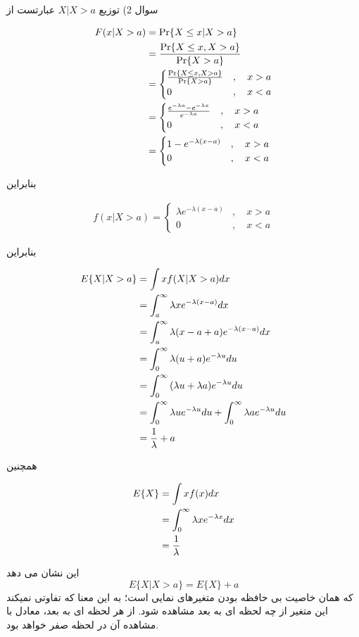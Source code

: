 \documentclass[10pt,letterpaper]{report}
\newcommand{\eqn}[1]{
\[\begin{split}
#1
\end{split}\]
}
\begin{document}
سوال 2) توزیع $X|X>a$ عبارتست از
\eqn{
F(x|X>a)&=\Pr\{X\le x|X>a\}
\\&={\Pr\{X\le x,X>a\}\over \Pr\{X>a\}}
\\&=
\begin{cases}
{\Pr\{X\le x,X>a\}\over \Pr\{X>a\}} &,\quad x>a\\
0&,\quad x<a
\end{cases}
\\&=
\begin{cases}
{e^{-\lambda a}-e^{-\lambda x}\over e^{-\lambda a}} &,\quad x>a\\
0&,\quad x<a
\end{cases}
\\&=
\begin{cases}
{1-e^{-\lambda (x-a)}} &,\quad x>a\\
0&,\quad x<a
\end{cases}
}
بنابراین
\eqn{
f(x|X>a)=
\begin{cases}
{\lambda e^{-\lambda (x-a)}} &,\quad x>a\\
0&,\quad x<a
\end{cases}
}
بنابراین
\eqn{
E\{X|X>a\}&=\int xf(X|X>a)dx
\\&=\int_a^\infty {\lambda xe^{-\lambda (x-a)}}dx
\\&=\int_a^\infty {\lambda (x-a+a)e^{-\lambda (x-a)}}dx
\\&=\int_0^\infty {\lambda (u+a)e^{-\lambda u}}du
\\&=\int_0^\infty {(\lambda u+\lambda a)e^{-\lambda u}}du
\\&=\int_0^\infty {\lambda ue^{-\lambda u}}du
+\int_0^\infty \lambda ae^{-\lambda u}du
\\&={1\over\lambda}
+a
}

همچنین
\eqn{
E\{X\}&=\int xf(x)dx
\\&=\int_0^\infty {\lambda xe^{-\lambda x}}dx
\\&={1\over\lambda}
}

این نشان می دهد
$$
E\{X|X>a\}=E\{X\}+a
$$
که همان خاصیت بی حافظه بودن متغیرهای نمایی است؛ به این معنا که تفاوتی نمیکند این متغیر از چه لحظه ای به بعد مشاهده شود. از هر لحظه ای به بعد، معادل با مشاهده آن در لحظه صفر خواهد بود.
\end{document}
